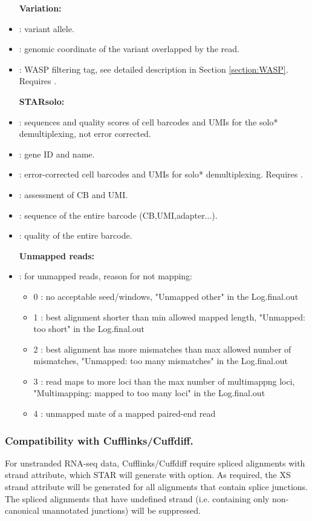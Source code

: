 \documentclass[12pt]{article}
\begin{document}
\begin{itemize}[itemsep=1pt]
\textbf{Variation:}
%
\item[]
 : variant allele.
%
\item[]
 : genomic coordinate of the variant overlapped by the read.
%
\item[]
 : WASP filtering tag, see detailed description in Section \ref{section:WASP}. Requires  .

\textbf{STARsolo:}
%
\item[]
 : sequences and quality scores of cell barcodes and UMIs for the solo* demultiplexing, not error corrected.
%
\item[]
 : gene ID and name.
%
\item[]
 : error-corrected cell barcodes and UMIs for solo* demultiplexing. Requires  .
%
\item[]
 : assessment of CB and UMI.
%
\item[]
 : sequence of the entire barcode (CB,UMI,adapter...).
%
\item[]
 : quality of the entire barcode.


\textbf{Unmapped reads:}
\item[]
 : for unmapped reads, reason for not mapping:
           \begin{itemize}[noitemsep,topsep=-3pt]
           	\item[] 0 : no acceptable seed/windows, "Unmapped other" in the Log.final.out
           	\item[] 1 : best alignment shorter than min allowed mapped length, "Unmapped: too short" in the Log.final.out
           	\item[] 2 : best alignment has more mismatches than max allowed number of mismatches, "Unmapped: too many mismatches" in the Log.final.out
			\item[] 3 : read maps to more loci than the max number of multimappng loci, "Multimapping: mapped to too many loci" in the Log.final.out
		    \item[] 4 : unmapped mate of a mapped paired-end read
           \end{itemize}

\end{itemize}

\subsubsection{Compatibility with Cufflinks/Cuffdiff.}
For unstranded RNA-seq data, Cufflinks/Cuffdiff require spliced alignments with  strand attribute, which STAR will generate with   option. As required, the XS strand attribute will be generated for all alignments that contain splice junctions. The spliced alignments that have undefined strand (i.e. containing only non-canonical unannotated junctions) will be suppressed.
\end{document}
